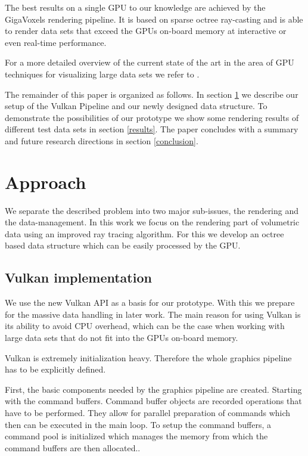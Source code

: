 \documentclass[12pt,conference]{IEEEtran}
\begin{document}
The best results on a single GPU to our knowledge are achieved by the GigaVoxels rendering pipeline\cite{crassin2009gigavoxels}. It is based on sparse octree ray-casting and is able to render data sets that exceed the GPUs on-board memory at interactive or even real-time performance.
\par
For a more detailed overview of the current state of the art in the area of GPU techniques for visualizing large data sets we refer to \cite{beyer2014survey}.
\par
The remainder of this paper is organized as follows. In section \ref{approach} we describe our setup of the Vulkan Pipeline and our newly designed data structure. To demonstrate the possibilities of our prototype we show some rendering results of different test data sets in section \ref{results}. The paper concludes with a summary and future research directions in section \ref{conclusion}.

\section{Approach}
\label{approach}
We separate the described problem into two major sub-issues, the rendering and the data-management. In this work we focus on the rendering part of volumetric data using an improved ray tracing algorithm. For this we develop an octree based data structure which can be easily processed by the GPU.  

\subsection{Vulkan implementation}
We use the new Vulkan API as a basis for our prototype. With this we prepare for the massive data handling in later work. The main reason for using Vulkan is its ability to avoid CPU overhead\cite{vulkan1.0.38spec}, which can be the case when working with large data sets that do not fit into the GPUs on-board memory.
\par
Vulkan is extremely initialization heavy. Therefore the whole graphics pipeline has to be explicitly defined. 

First, the basic components needed by the graphics pipeline are created. Starting with the command buffers. Command buffer objects are recorded operations that have to be performed. They allow for parallel preparation of commands which then can be executed in the main loop. To setup the command buffers, a command pool is initialized which manages the memory from which the command buffers are then allocated..
\end{document}
